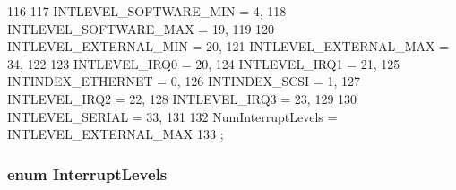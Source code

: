 \begin{DoxyCode}
116 {
117     INTLEVEL_SOFTWARE_MIN = 4,
118     INTLEVEL_SOFTWARE_MAX = 19,
119 
120     INTLEVEL_EXTERNAL_MIN = 20,
121     INTLEVEL_EXTERNAL_MAX = 34,
122 
123     INTLEVEL_IRQ0 = 20,
124     INTLEVEL_IRQ1 = 21,
125     INTINDEX_ETHERNET = 0,
126     INTINDEX_SCSI = 1,
127     INTLEVEL_IRQ2 = 22,
128     INTLEVEL_IRQ3 = 23,
129 
130     INTLEVEL_SERIAL = 33,
131 
132     NumInterruptLevels = INTLEVEL_EXTERNAL_MAX
133 };
\end{DoxyCode}
\hypertarget{namespaceMipsISA_aa201d1f9b8ac67b80bdf6c08f370558c}{
\subsubsection[{InterruptLevels}]{\setlength{\rightskip}{0pt plus 5cm}enum {\bf InterruptLevels}}}
\label{namespaceMipsISA_aa201d1f9b8ac67b80bdf6c08f370558c}
